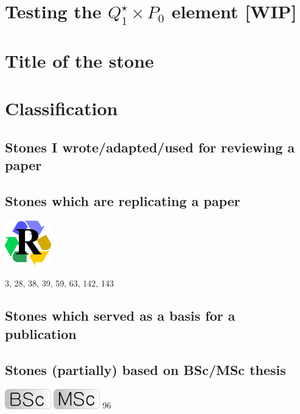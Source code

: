 \documentclass[a4paper,11pt]{report}
\begin{document}
\chapter{Testing the $Q_1^\star \times P_0$ element [WIP] \label{f162}} %



\chapter{Title of the stone}

\appendix
\chapter{Classification}

\section{
Stones I wrote/adapted/used for reviewing a paper}

\section{
Stones which are replicating a paper}

\includegraphics[width=2cm]{images/pictograms/replication}

3, 28, 38, 39, 59, 63, 142, 143

\section{
Stones which served as a basis for a publication}



\section{
Stones (partially) based on BSc/MSc thesis}

\includegraphics[width=2cm]{images/pictograms/bsc}
\includegraphics[width=2cm]{images/pictograms/msc}
96






\printbibliography

\newpage
{}
\end{document}
